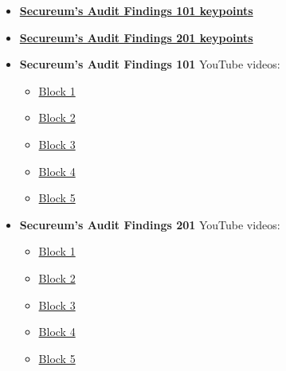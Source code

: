 \begin{itemize}
\tightlist
\item
  \href{https://secureum.substack.com/p/audit-findings-101}{\textbf{Secureum's
  Audit Findings 101 keypoints}}
\item
  \href{https://secureum.substack.com/p/audit-findings-201}{\textbf{Secureum's
  Audit Findings 201 keypoints}}
\item
  \textbf{Secureum's Audit Findings 101} YouTube videos:

  \begin{itemize}
  \tightlist
  \item
    \href{https://www.youtube.com/watch?v=SromSImIpHE}{Block 1}
  \item
    \href{https://www.youtube.com/watch?v=KLBi3Uyg0dY}{Block 2}
  \item
    \href{https://www.youtube.com/watch?v=RUyED_6mkqg}{Block 3}
  \item
    \href{https://www.youtube.com/watch?v=D1Uz0NvrqeU}{Block 4}
  \item
    \href{https://www.youtube.com/watch?v=GX8Z0kRRi_I}{Block 5}
  \end{itemize}
\item
  \textbf{Secureum's Audit Findings 201} YouTube videos:

  \begin{itemize}
  \tightlist
  \item
    \href{https://www.youtube.com/watch?v=IXm6JAprhuw}{Block 1}
  \item
    \href{https://www.youtube.com/watch?v=yphqu2N35X4}{Block 2}
  \item
    \href{https://www.youtube.com/watch?v=zAzNDwu23UI}{Block 3}
  \item
    \href{https://www.youtube.com/watch?v=poxzr4-srn0}{Block 4}
  \item
    \href{https://www.youtube.com/watch?v=0J7KI4WGd0Q}{Block 5}
  \end{itemize}
\end{itemize}
